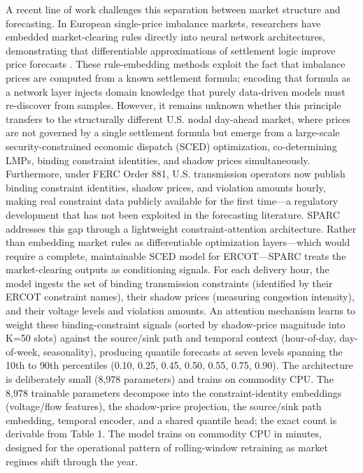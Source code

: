 A recent line of work challenges this separation between market structure and forecasting. In European single-price imbalance markets, researchers have embedded market-clearing rules directly into neural network architectures, demonstrating that differentiable approximations of settlement logic improve price forecasts \cite{yu2026marketruleinformed}. These rule-embedding methods exploit the fact that imbalance prices are computed from a known settlement formula; encoding that formula as a network layer injects domain knowledge that purely data-driven models must re-discover from samples. However, it remains unknown whether this principle transfers to the structurally different U.S. nodal day-ahead market, where prices are not governed by a single settlement formula but emerge from a large-scale security-constrained economic dispatch (SCED) optimization, co-determining LMPs, binding constraint identities, and shadow prices simultaneously. Furthermore, under FERC Order 881, U.S. transmission operators now publish binding constraint identities, shadow prices, and violation amounts hourly, making real constraint data publicly available for the first time---a regulatory development that has not been exploited in the forecasting literature.
SPARC addresses this gap through a lightweight constraint-attention architecture. Rather than embedding market rules as differentiable optimization layers---which would require a complete, maintainable SCED model for ERCOT---SPARC treats the market-clearing outputs as conditioning signals. For each delivery hour, the model ingests the set of binding transmission constraints (identified by their ERCOT constraint names), their shadow prices (measuring congestion intensity), and their voltage levels and violation amounts. An attention mechanism learns to weight these binding-constraint signals (sorted by shadow-price magnitude into K=50 slots) against the source/sink path and temporal context (hour-of-day, day-of-week, seasonality), producing quantile forecasts at seven levels spanning the 10th to 90th percentiles (0.10, 0.25, 0.45, 0.50, 0.55, 0.75, 0.90). The architecture is deliberately small (8,978 parameters) and trains on commodity CPU. The 8,978 trainable parameters decompose into the constraint-identity embeddings (voltage/flow features), the shadow-price projection, the source/sink path embedding, temporal encoder, and a shared quantile head; the exact count is derivable from Table 1. The model trains on commodity CPU in minutes, designed for the operational pattern of rolling-window retraining as market regimes shift through the year.
